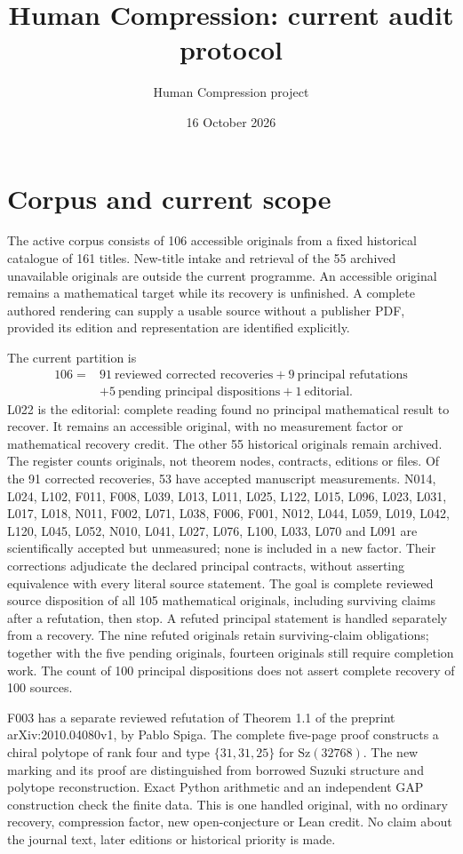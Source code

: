 \documentclass[11pt,a4paper]{article}
\title{Human Compression: current audit protocol}
\author{Human Compression project}
\date{16 October 2026}
\begin{document}
\maketitle

\section{Corpus and current scope}

The active corpus consists of 106 accessible originals from a fixed historical
catalogue of 161 titles. New-title intake and retrieval of the 55 archived
unavailable originals are outside the current programme. An accessible original
remains a mathematical target while its recovery is unfinished. A complete
authored rendering can supply a usable source without a publisher PDF, provided
its edition and representation are identified explicitly.

The current partition is
\[
\begin{aligned}
106={}&91\ \text{reviewed corrected recoveries}+9\ \text{principal refutations}\\
      &+5\ \text{pending principal dispositions}+1\ \text{editorial}.
\end{aligned}
\]
L022 is the editorial: complete reading found no principal mathematical result
to recover. It remains an accessible original, with no measurement factor or
mathematical recovery credit. The other 55 historical originals remain archived.
The register counts originals, not theorem nodes, contracts, editions or files.
Of the 91 corrected recoveries, 53 have accepted manuscript measurements.
N014, L024, L102, F011, F008, L039, L013, L011, L025, L122, L015, L096, L023, L031, L017, L018, N011, F002, L071, L038, F006, F001, N012, L044, L059, L019, L042, L120, L045, L052, N010, L041, L027, L076, L100, L033, L070 and L091 are scientifically accepted but unmeasured; none is included
in a new factor. Their corrections adjudicate the declared principal contracts,
without asserting equivalence with every literal source statement. The goal
is complete reviewed source disposition of all 105 mathematical originals,
including surviving claims after a refutation, then stop. A refuted principal
statement is handled separately from a recovery. The nine refuted originals
retain surviving-claim obligations; together with the five pending originals,
fourteen originals still require completion work. The count of 100 principal
dispositions does not assert complete recovery of 100 sources.

F003 has a separate reviewed refutation of Theorem 1.1 of the preprint
arXiv:2010.04080v1, by Pablo Spiga. The complete five-page proof constructs a
chiral polytope of rank four and type $\{31,31,25\}$ for $\mathrm{Sz}(32768)$.
The new marking and its proof are distinguished from borrowed Suzuki structure
and polytope reconstruction. Exact Python arithmetic and an independent GAP
construction check the finite data. This is one handled original, with no
ordinary recovery, compression factor, new open-conjecture or Lean credit.
No claim about the journal text, later editions or historical priority is made.
\end{document}
